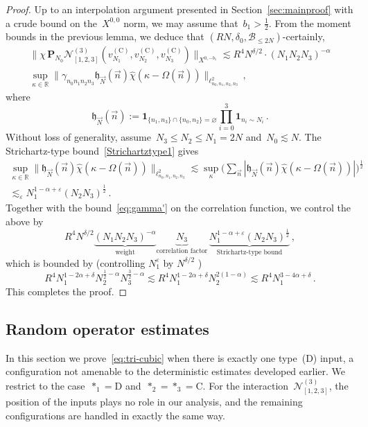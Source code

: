 \documentclass[11pt,reqno,english]{amsart}
\numberwithin{equation}{section}
\theoremstyle{plain}
\theoremstyle{definition}
\theoremstyle{remark}
\renewcommand{\epsilon}{\varepsilon}
\newcommand{\R}{\mathbb{R}}
\begin{document}
\begin{proof}
	Up to an interpolation argument presented in Section~\ref{sec:mainproof} with a crude bound on the~$X^{0,0}$ norm, we may assume that~$b_{1}>\frac{1}{2}$. From the moment bounds in the previous lemma, we deduce that $(RN,\delta_{0},\mathcal{B}_{\leq 2N})$-certainly,
	\begin{multline*}
		\big\|
		\chi\,\mathbf{P}_{N_{0}}
		\mathcal{N}_{[1,2,3]}^{(3)}(v^{(\mathrm{C})}_{N_{1}},
	v^{(\mathrm{C})}_{N_{2}},v^{(\mathrm{C})}_{N_{3}})\big\|_{X^{0,-b_{1}}}
		\lesssim R^{4}N^{\delta/2}
		\cdot
		(N_{1}N_{2}N_{3})^{-\alpha}\\
		\sup_{\kappa\in\R}
		\|\gamma_{n_{0}n_{1}n_{2}n_{3}}\mathfrak{h}_{\vec{N}}(\vec{n})
		\widehat{\chi}(\kappa-\Omega(\vec{n}))\|_{\ell_{n_{0},n_{1},n_{2},n_{3}}^{2}}\,,
	\end{multline*}
	where
	\[
	\mathfrak{h}_{\vec{N}}(\vec{n})
	:=\mathbf{1}_{\{n_{1},n_{3}\}\cap\{n_{0},n_{2}\}=\varnothing}\prod_{i=0}^{3}
	\mathbf{1}_{n_{i}\sim N_{i}}\,.
	\]
	Without loss of generality, assume~$N_{3}\leq N_{2}\leq N_{1}=2N$ and~$N_{0}\lesssim N$. The Strichartz-type bound~\eqref{Strichartztype1} gives
	\begin{multline*}
		\sup_{\kappa\in\R}
		\|
		\mathfrak{h}_{\vec{N}}(\vec{n})
		\widehat{\chi}(\kappa-\Omega(\vec{n}))
		\|_{\ell_{n_{0},n_{1},n_{2},n_{3}}^{2}}
		\lesssim
		\sup_{\kappa}
		\Big(\sum_{\vec{n}}|\mathfrak{h}_{\vec{N}}(\vec{n})
		\widehat{\chi}(\kappa-\Omega(\vec{n}))|
		\Big)^{\frac{1}{2}}
		\\
		\lesssim_{\varepsilon} N_{1}^{1-\alpha+\varepsilon}(N_{2}N_{3})^{\frac{1}{2}}\,.
	\end{multline*}
	Together with the bound~\eqref{eq:gamma'} on the correlation function, we control the above by
	\[
	R^{4}N^{\delta/2}
	\underbrace{(N_{1}N_{2}N_{3})^{-\alpha}}_{\text{weight}}
	\underbrace{N_{3}}_{\text{correlation factor}}
	\,\underbrace{
		N_{1}^{1-\alpha+\varepsilon}(N_{2}N_{3})^{\frac{1}{2}}
	}_{\text{Strichartz-type bound}}\,,
	\]
	which is bounded by (controlling $N_1^{\epsilon}$ by $N^{\delta/2}$ )
	\[
	R^{4}
	N_{1}^{1-2\alpha+\delta}N_{2}^{\frac{1}{2}-\alpha}N_{3}^{\frac{3}{2}-\alpha}
	\lesssim
	R^{4}
	N_{1}^{1-2\alpha+\delta}N_{2}^{2(1-\alpha)}
	\lesssim
	R^{4}
	N_{1}^{3-4\alpha+\delta}\,.
	\]
	This completes the proof.
\end{proof}


\subsection{Random operator estimates}
In this section we prove~\eqref{eq:tri-cubic} when there is exactly one type~(D) input, a configuration not amenable to the deterministic estimates developed earlier.
We restrict to the case~$\ast_{1}= \mathrm{D}$ and~$\ast_{2}=\ast_{3}=\mathrm{C}$.
For the interaction~$\mathcal{N}_{[1,2,3]}^{(3)}$, the position of the inputs plays no role in our analysis, and the remaining configurations are handled in exactly the same way.
\end{document}
